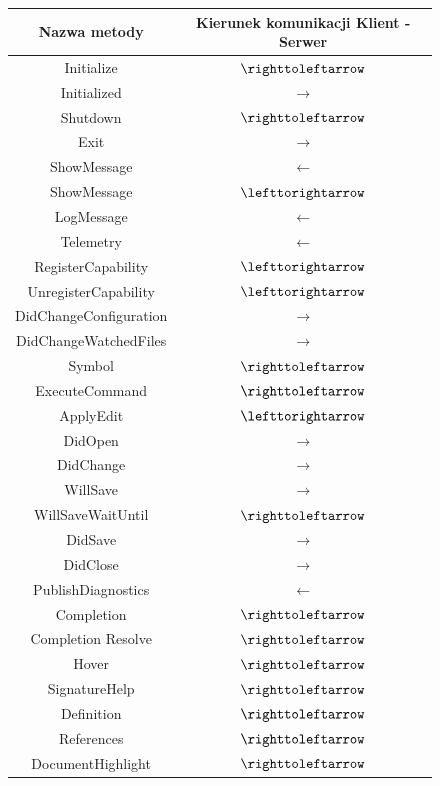 \begin{figure}[H]
    \centering
    \small
\begin{tabular}{|c|c|}
\hline
Nazwa metody & Kierunek komunikacji Klient - Serwer\\
\hline
Initialize & $\righttoleftarrow$ \\   
\hline
Initialized & $\rightarrow$ \\
\hline
Shutdown & $\righttoleftarrow$ \\   
\hline
Exit & $\rightarrow$ \\
\hline
ShowMessage & $\leftarrow$ \\
\hline
ShowMessage & $\lefttorightarrow$ \\
\hline
LogMessage & $\leftarrow$ \\
\hline
Telemetry & $\leftarrow$ \\
\hline
RegisterCapability & $\lefttorightarrow$ \\
\hline
UnregisterCapability & $\lefttorightarrow$ \\
\hline
DidChangeConfiguration & $\rightarrow$ \\
\hline
DidChangeWatchedFiles & $\rightarrow$ \\
\hline
Symbol & $\righttoleftarrow$ \\
\hline
ExecuteCommand & $\righttoleftarrow$ \\
\hline
ApplyEdit & $\lefttorightarrow$ \\
\hline
DidOpen & $\rightarrow$ \\
\hline
DidChange & $\rightarrow$ \\
\hline
WillSave & $\rightarrow$ \\
\hline
WillSaveWaitUntil & $\righttoleftarrow$ \\
\hline
DidSave & $\rightarrow$ \\
\hline
DidClose & $\rightarrow$ \\
\hline
PublishDiagnostics & $\leftarrow$ \\
\hline
Completion & $\righttoleftarrow$ \\
\hline
Completion Resolve & $\righttoleftarrow$ \\
\hline
Hover & $\righttoleftarrow$ \\
\hline
SignatureHelp & $\righttoleftarrow$ \\
\hline
Definition & $\righttoleftarrow$ \\
\hline
References & $\righttoleftarrow$ \\
\hline
DocumentHighlight & $\righttoleftarrow$ \\

\end{tabular}
\end{figure}
